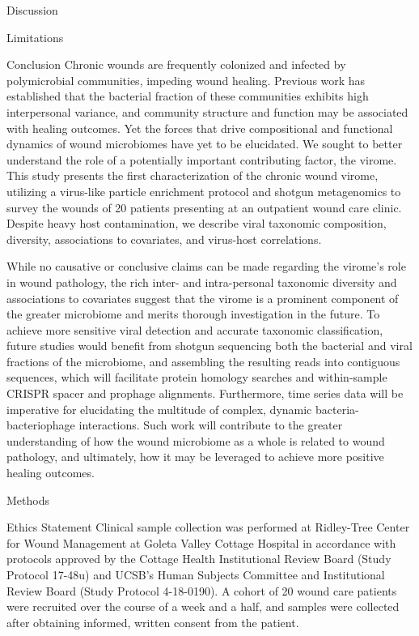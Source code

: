 \documentclass[oneside,12pt,final]{sty/ucthesis-CA2012}
\begin{document}
\begin{mainmatter}
\begin{section}{Discussion}
\begin{subsection}{Limitations}
\end{subsection}
\end{section}

\begin{section}{Conclusion}
Chronic wounds are frequently colonized and infected by polymicrobial communities, impeding wound healing. Previous work has established that the bacterial fraction of these communities exhibits high interpersonal variance, and community structure and function may be associated with healing outcomes. Yet the forces that drive compositional and functional dynamics of wound microbiomes have yet to be elucidated. We sought to better understand the role of a potentially important contributing factor, the virome. This study presents the first characterization of the chronic wound virome, utilizing a virus-like particle enrichment protocol and shotgun metagenomics to survey the wounds of 20 patients presenting at an outpatient wound care clinic. Despite heavy host contamination, we describe viral taxonomic composition, diversity, associations to covariates, and virus-host correlations. 

While no causative or conclusive claims can be made regarding the virome's role in wound pathology, the rich inter- and intra-personal taxonomic diversity and associations to covariates suggest that the virome is a prominent component of the greater microbiome and merits thorough investigation in the future. To achieve more sensitive viral detection and accurate taxonomic classification, future studies would benefit from shotgun sequencing both the bacterial and viral fractions of the microbiome, and assembling the resulting reads into contiguous sequences, which will facilitate protein homology searches and within-sample CRISPR spacer and prophage alignments. Furthermore, time series data will be imperative for elucidating the multitude of complex, dynamic bacteria-bacteriophage interactions. Such work will contribute to the greater understanding of how the wound microbiome as a whole is related to wound pathology, and ultimately, how it may be leveraged to achieve more positive healing outcomes.

\end{section}

\begin{section}{Methods}

\begin{subsection}{Ethics Statement}
Clinical sample collection was performed at Ridley-Tree Center for Wound Management at Goleta Valley Cottage Hospital in accordance with protocols approved by the Cottage Health Institutional Review Board (Study Protocol 17-48u) and UCSB's Human Subjects Committee and Institutional Review Board (Study Protocol 4-18-0190). A cohort of 20 wound care patients were recruited over the course of a week and a half, and samples were collected after obtaining informed, written consent from the patient.
\end{subsection}


\end{section}
\end{mainmatter}
\end{document}
